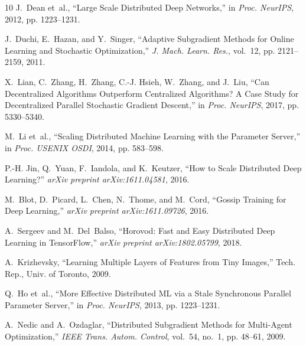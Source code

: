 \documentclass[conference]{IEEEtran}
\begin{document}
\begin{thebibliography}{10}
J.~Dean et~al., ``Large Scale Distributed Deep Networks,'' in \emph{Proc. NeurIPS}, 2012, pp. 1223--1231.

J.~Duchi, E.~Hazan, and Y.~Singer, ``Adaptive Subgradient Methods for Online Learning and Stochastic Optimization,'' \emph{J. Mach. Learn. Res.}, vol.~12, pp. 2121--2159, 2011.

X.~Lian, C.~Zhang, H.~Zhang, C.-J. Hsieh, W.~Zhang, and J.~Liu, ``Can Decentralized Algorithms Outperform Centralized Algorithms? A Case Study for Decentralized Parallel Stochastic Gradient Descent,'' in \emph{Proc. NeurIPS}, 2017, pp. 5330--5340.

M.~Li et~al., ``Scaling Distributed Machine Learning with the Parameter Server,'' in \emph{Proc. USENIX OSDI}, 2014, pp. 583--598.

P.-H. Jin, Q.~Yuan, F.~Iandola, and K.~Keutzer, ``How to Scale Distributed Deep Learning?'' \emph{arXiv preprint arXiv:1611.04581}, 2016.

M.~Blot, D.~Picard, L.~Chen, N.~Thome, and M.~Cord, ``Gossip Training for Deep Learning,'' \emph{arXiv preprint arXiv:1611.09726}, 2016.

A.~Sergeev and M.~Del~Balso, ``Horovod: Fast and Easy Distributed Deep Learning in TensorFlow,'' \emph{arXiv preprint arXiv:1802.05799}, 2018.

A.~Krizhevsky, ``Learning Multiple Layers of Features from Tiny Images,'' Tech. Rep., Univ. of Toronto, 2009.

Q.~Ho et~al., ``More Effective Distributed ML via a Stale Synchronous Parallel Parameter Server,'' in \emph{Proc. NeurIPS}, 2013, pp. 1223--1231.

A.~Nedic and A.~Ozdaglar, ``Distributed Subgradient Methods for Multi-Agent Optimization,'' \emph{IEEE Trans. Autom. Control}, vol.~54, no.~1, pp. 48--61, 2009.
\end{thebibliography}
\end{document}
